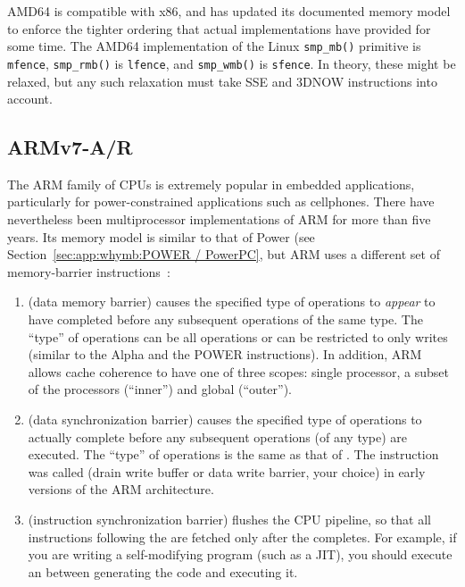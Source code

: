 AMD64 is compatible with x86, and has updated its documented memory
model~\cite{AMDOpteron:2:2007}
to enforce the tighter ordering that actual implementations have
provided for some time.
The AMD64 implementation of the Linux {\tt smp\_mb()} primitive is {\tt mfence},
{\tt smp\_rmb()} is {\tt lfence}, and {\tt smp\_wmb()} is {\tt sfence}.
In theory, these might be relaxed, but any such relaxation must take
SSE and 3DNOW instructions into account.

\subsection{ARMv7-A/R}

The ARM family of CPUs is extremely popular in embedded applications,
particularly for power-constrained applications such as cellphones.
There have nevertheless been multiprocessor implementations of ARM
for more than five years.
Its memory model is similar to that of Power
(see Section~\ref{sec:app:whymb:POWER / PowerPC}, but ARM uses a
different set of memory-barrier instructions~\cite{ARMv7A:2010}:

\begin{enumerate}
\item	{} (data memory barrier) causes the specified type of
	operations to \emph{appear} to have completed before any
	subsequent operations of the same type.
	The ``type'' of operations can be all operations or can be
	restricted to only writes (similar to the Alpha 
	and the POWER  instructions).
	In addition, ARM allows cache coherence to have one of three
	scopes: single processor, a subset of the processors
	(``inner'') and global (``outer'').
\item	{} (data synchronization barrier) causes the specified
	type of operations to actually complete before any subsequent
	operations (of any type) are executed.
	The ``type'' of operations is the same as that of .
	The  instruction was called  (drain write buffer
	or data write barrier, your choice) in early versions of the
	ARM architecture.
\item	{} (instruction synchronization barrier) flushes the CPU
	pipeline, so that all instructions following the 
	are fetched only after the  completes.
	For example, if you are writing a self-modifying program
	(such as a JIT), you should execute an  between
	generating the code and executing it.
\end{enumerate}

